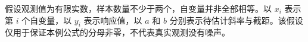 假设观测值为有限实数，样本数量不少于两个，自变量并非全部相等。以 $x_i$ 表示第 $i$ 个自变量，以 $y_i$ 表示响应值，以 $a$ 和 $b$ 分别表示待估计斜率与截距。该假设仅用于保证本例公式的分母非零，不代表真实观测没有噪声。
